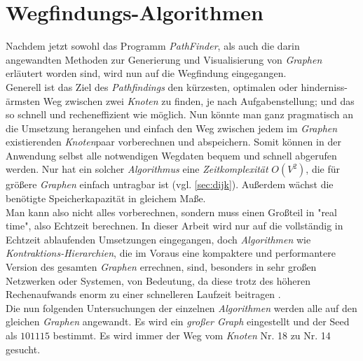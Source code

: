 \documentclass[12pt]{article}
\begin{document}
\section{Wegfindungs-Algorithmen}
Nachdem jetzt sowohl das Programm \textit{PathFinder}, als auch die darin angewandten Methoden zur Generierung und Visualisierung von \textit{Graphen} erläutert worden sind, wird nun auf die Wegfindung eingegangen.
\\
Generell ist das Ziel des \textit{Pathfindings} den kürzesten, optimalen oder hinderniss-ärmsten Weg zwischen zwei \textit{Knoten} zu finden, je nach Aufgabenstellung; und das so schnell und recheneffizient wie möglich. Nun könnte man ganz pragmatisch an die Umsetzung herangehen und einfach den Weg zwischen jedem im \textit{Graphen} existierenden \textit{Knoten}paar vorberechnen und abspeichern. Somit können in der Anwendung selbst alle notwendigen Wegdaten bequem und schnell abgerufen werden. Nur hat ein solcher \textit{Algorithmus} eine \textit{Zeitkomplexität} $O(V^2)$, die für größere \textit{Graphen} einfach untragbar ist (vgl. \autoref{sec:dijk}). Außerdem wächst die benötigte Speicherkapazität in gleichem Maße.
\\
Man kann also nicht alles vorberechnen, sondern muss einen Großteil in "real time", also Echtzeit berechnen. In dieser Arbeit wird nur auf die vollständig in Echtzeit ablaufenden Umsetzungen eingegangen, doch \textit{Algorithmen} wie \textit{Kontraktions-Hierarchien}, die im Voraus eine kompaktere und performantere Version des gesamten \textit{Graphen} errechnen, sind, besonders in sehr großen Netzwerken oder Systemen, von Bedeutung, da diese trotz des höheren Rechenaufwands enorm zu einer schnelleren Laufzeit beitragen \cite{contr-hier}.
\\
Die nun folgenden Untersuchungen der einzelnen \textit{Algorithmen} werden alle auf den gleichen \textit{Graphen} angewandt. Es wird ein \textit{großer Graph} eingestellt und der Seed als $101115$ bestimmt. Es wird immer der Weg vom \textit{Knoten} Nr. 18 zu Nr. 14 gesucht.
\end{document}
